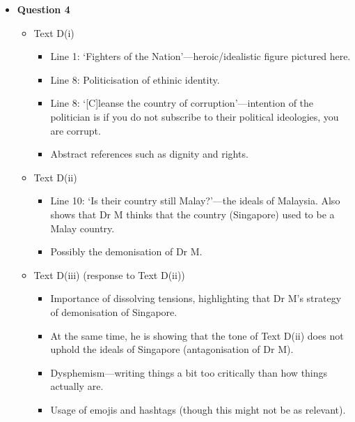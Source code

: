 \documentclass[../main.tex]{subfiles}
\begin{document}
\begin{itemize}
					\item \textbf{Question 4} \begin{itemize}
						\item Text D(i) \begin{itemize}
							\item Line 1: `Fighters of the Nation'---heroic/idealistic figure pictured here.
							\item Line 8: Politicisation of ethinic identity.
							\item Line 8: `[C]leanse the country of corruption'---intention of the politician is if you do not subscribe to their political ideologies, you are corrupt.
							\item Abstract references such as dignity and rights.
						\end{itemize}
						\item Text D(ii) \begin{itemize}
							\item Line 10: `Is their country still Malay?'---the ideals of Malaysia. Also shows that Dr M thinks that the country (Singapore) used to be a Malay country.
							\item Possibly the demonisation of Dr M.
						\end{itemize}
						\item Text D(iii) (response to Text D(ii)) \begin{itemize}
							\item Importance of dissolving tensions, highlighting that Dr M's strategy of demonisation of Singapore.
							\item At the same time, he is showing that the tone of Text D(ii) does not uphold the ideals of Singapore (antagonisation of Dr M).
							\item Dysphemism---writing things a bit too critically than how things actually are.
							\item Usage of emojis and hashtags (though this might not be as relevant).
						\end{itemize}
					\end{itemize}
				\end{itemize}
\end{document}
